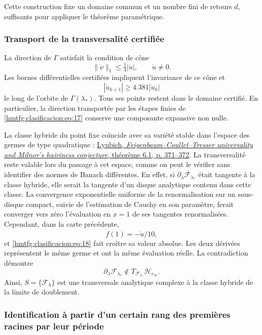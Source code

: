 Cette construction fixe un domaine commun et un nombre fini de retours \(d\), suffisants pour appliquer le théorème paramétrique.

\subsubsection{Transport de la transversalité certifiée}
\label{hmtfg:clasificacion:8.2}

La direction de \(\Gamma\) satisfait la condition de cône
\[
\|\dot\nu\|_1\le\tfrac14|\dot u|,\qquad \dot u\ne0.
\]
Les bornes différentielles certifiées impliquent l’invariance de ce cône et
\begin{equation}
|\dot u_{k+1}|\ge4.381|\dot u_k|
\label{hmtfg:clasificacion:eq:18}
\end{equation}
le long de l’orbite de \(\Gamma(\lambda_*)\). Tous ses points restent dans le domaine certifié. En particulier, la direction transportée par les étapes finies de \eqref{hmtfg:clasificacion:eq:17} conserve une composante expansive non nulle.

La classe hybride du point fixe coïncide avec sa variété stable dans l’espace des germes de type quadratique : \href{https://www.maths.tcd.ie/EMIS/journals/Annals/149_2/lyubich.pdf}{Lyubich, \emph{Feigenbaum–Coullet–Tresser universality and Milnor's hairiness conjecture}, théorème 6.1, p. 371–372}. La transversalité reste valable lors du passage à cet espace, comme on peut le vérifier sans identifier des normes de Banach différentes. En effet, si \(\partial_\lambda\mathcal F_{\lambda_*}\) était tangente à la classe hybride, elle serait la tangente d’un disque analytique contenu dans cette classe. La convergence exponentielle uniforme de la renormalisation sur un sous-disque compact, suivie de l’estimation de Cauchy en son paramètre, ferait converger vers zéro l’évaluation en \(x=1\) de ses tangentes renormalisées. Cependant, dans la carte précédente,
\[
\dot f(1)=-\dot u/10,
\]
et \eqref{hmtfg:clasificacion:eq:18} fait croître sa valeur absolue. Les deux dérivées représentent le même germe et ont la même évaluation réelle. La contradiction démontre
\begin{equation}
\partial_\lambda\mathcal F_{\lambda_*}
\notin T_{\mathcal F_{\lambda_*}}\mathcal H_{c_\infty}.
\label{hmtfg:clasificacion:eq:19}
\end{equation}
Ainsi, \(S=\{\mathcal F_\lambda\}\) est une transversale analytique complexe à la classe hybride de la limite de doublement.

\subsubsection{Identification à partir d’un certain rang des premières racines par leur période}
\label{hmtfg:clasificacion:8.3}

